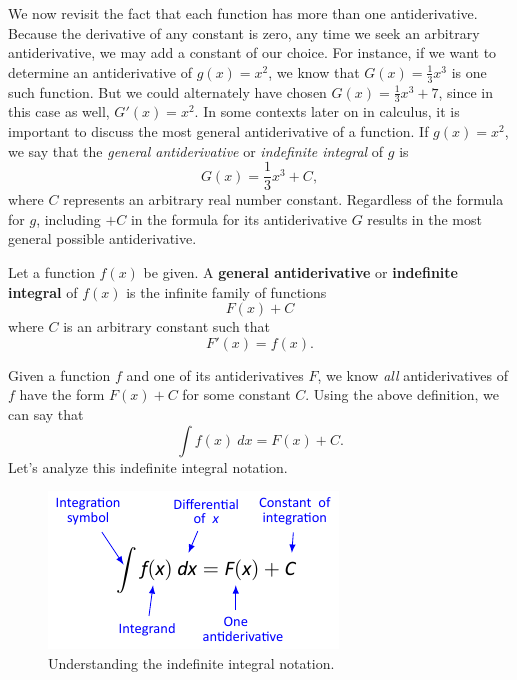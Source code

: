 
We now revisit the fact that each function has more than one antiderivative.  Because the derivative of any constant is zero, any time we seek an arbitrary antiderivative, we may add a constant of our choice.  For instance, if we want to determine an antiderivative of $g(x) = x^2$, we know that $G(x) = \frac{1}{3}x^3$ is one such function.  But we could alternately have chosen $G(x) = \frac{1}{3}x^3 + 7$, since in this case as well, $G'(x) = x^2$.  In some contexts later on in calculus, it is important to discuss the most general antiderivative of a function.  If $g(x) = x^2$, we say that the \emph{general antiderivative}  or \emph{indefinite integral} of $g$ is 
\[ G(x) = \frac{1}{3}x^3 + C, \]
where $C$ represents an arbitrary real number constant.  Regardless of the formula for $g$, including $+C$ in the formula for its antiderivative $G$ results in the most general possible antiderivative.

{Let a function $f(x)$ be given. A \textbf{general antiderivative} or \textbf{indefinite integral} of $f(x)$ is the infinite family of  functions 
\[ F(x) + C\]
where $C$ is an arbitrary constant such that 
\[ F'(x) = f(x).\]
}%

Given a function $f$ and one of its antiderivatives $F$, we know \textit{all} antiderivatives of $f$ have the form $F(x) + C$ for some constant $C$. Using the above definition, we can say that
\[ \int f(x) \ dx = F(x) + C. \]
Let's analyze this indefinite integral notation.

\begin{figure}[h]
\begin{center}
\includegraphics[scale=1.375]{figs/4/4-5_figanti1.pdf}
\caption{Understanding the indefinite integral notation.}\label{fig:4-5_figanti1}
\end{center}
\end{figure}


